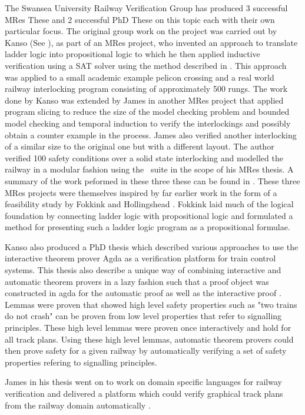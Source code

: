 The Swansea University Railway Verification Group has produced 3 successful MRes These and 2 successful PhD These on this topic each with their own particular focus. The original group work on the project was carried out by Kanso (See \cite{KK08}), as part of an MRes project,  who invented an approach to translate ladder logic into propositional logic to which he then applied inductive verification using a SAT solver \cite{KK09} using the method described in \cite{MS00}. This approach was applied to a small academic example pelicon crossing and a real world railway interlocking program consisting of approximately 500 rungs. The work done by Kanso was extended by James in another MRes project \cite{PJ10} that applied program slicing to reduce the size of the model checking problem and bounded model checking and temporal induction to verify the interlockings and possibly obtain a counter example in the process. James also verified another interlocking of a similar size to the original one but with a different layout. The author verified 100 safety conditions over a solid state interlocking and modelled the railway in a modular fashion using the  \scade \, suite in the scope of his MRes thesis. A summary of the work peformed in these three these can be found in \cite{fmbokpaper}. These three MRes projects were themselves inspired by far earlier work in the form of a feasibility study by Fokkink and Hollingshead \cite{WF98}. Fokkink laid much of the logical foundation by connecting ladder logic with propositional logic and formulated a method for presenting such a ladder logic program as a propositional formulae.

Kanso also produced a PhD thesis \cite{KarimPhD} which described various approaches to use the interactive theorem prover Agda as a verification platform for train control systems. This thesis also describe a unique way of combining interactive and automatic theorem provers in a lazy fashion such that a proof object was constructed in agda for the automatic proof as well as the interactive proof \cite{KarimPaper}. Lemmas were proven that showed high level safety properties such as "two trains do not crash" can be proven from low level properties that refer to  signalling principles. These high level lemmas were proven once interactively and hold for all track plans. Using these high level lemmas, automatic theorem provers could then prove safety for a given railway by automatically verifying a set of safety properties refering to signalling principles.

James in his thesis went on to work on domain specific languages for railway verification and delivered a platform which could verify graphical track plans from the railway domain automatically  \cite{PhilPhD}.

